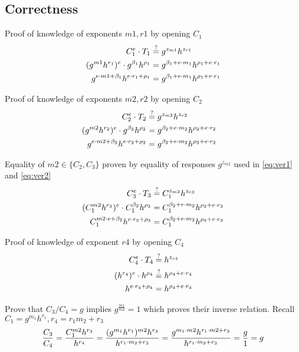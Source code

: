 \subsection{Correctness}
Proof of knowledge of exponents $m1, r1$ by opening $C_1$ 
\begin{align}
    C_1^e \cdot T_1 &\stackrel{?}{=} g^{z_{m1}} h^{z_{r1}} \notag \\
    (g^{m1}h^{r_1})^e \cdot g^{\beta_1}h^{\rho_1} &= g^{\beta_1 + e \cdot m_1} h^{\rho_1 + e \cdot r_1} \notag \\
    g^{e \cdot m1 + \beta_1}h^{e \cdot r_1 + \rho_1} &= g^{\beta_1 + e \cdot m_1} h^{\rho_1 + e \cdot r_1} \notag 
\end{align}

Proof of knowledge of exponents $m2, r2$ by opening $C_2$ 
\begin{align}
    C_2^e \cdot T_2 &\stackrel{?}{=} g^{z_{m2}} h^{z_{r2}} && \label{eq:ver1} \\
    (g^{m2}h^{r_2})^e \cdot g^{\beta_2}h^{\rho_2} &= g^{\beta_2 + e \cdot m_2} h^{\rho_2 + e \cdot r_2} \notag \\
    g^{e \cdot m2 + \beta_2}h^{e \cdot r_2 + \rho_2} &= g^{\beta_2 + e \cdot m_2} h^{\rho_2 + e \cdot r_2} \notag 
\end{align}


Equality of $m2 \in \{C_2, C_3\}$ proven by equality of responses $g^{z_{m2}}$ used in \eqref{eq:ver1} and \eqref{eq:ver2}
\begin{align}
    C_3^e \cdot T_3 &\stackrel{?}{=} C_1^{z_{m2}} h^{z_{r3}} \notag \\
    (C_1^{m2}h^{r_3})^e \cdot C_1^{\beta_2}h^{\rho_3} &= C_1^{\beta_2 + e \cdot m_2} h^{\rho_3 + e \cdot r_3} \label{eq:ver2} \\
    C_1^{m2 \cdot e + \beta_2}h^{e \cdot r_3 + \rho_3} &= C_1^{\beta_2 + e \cdot m_2} h^{\rho_3 + e \cdot r_3} \notag
\end{align}

Proof of knowledge of exponent $r4$ by opening $C_4$ 
\begin{align}
    C_4^e \cdot T_4 &\stackrel{?}{=} h^{z_{r4}} \notag \\
    (h^{r_4})^e \cdot h^{\rho_4} &\stackrel{?}{=} h^{\rho_4 + e \cdot r_4} \notag \\
    h^{e \cdot r_4 + \rho_4} &= h^{\rho_4 + e \cdot r_4} \notag
\end{align}

Prove that $C_3/C_4 = g$ implies $g^{\frac{m1}{m2}} = 1$ which proves their inverse relation. Recall $C_1 = g^{m_1}h^{r_1}, r_4 = r_1m_2 + r_3$
\begin{align}
    \dfrac{C_3}{C_4} = \dfrac{C_1^{m2}h^{r_3}}{h^{r_4}} = \dfrac{(g^{m_1}h^{r_1})^{m2}h^{r_3}}{h^{r_1 \cdot m_2 + r_3}} = \dfrac{g^{m_1\cdot m2}h^{r_1\cdot m2 + r_3}}{h^{r_1 \cdot m_2 + r_3}} = \dfrac{g}{1} = g \notag \\
\end{align}

